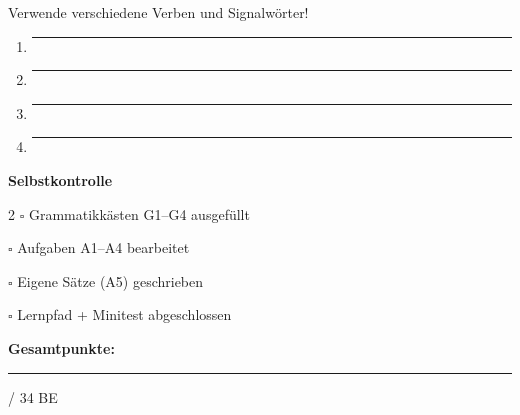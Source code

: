 \documentclass[11pt, a4paper]{article}
\newcommand{\gesamtpunkte}{34}
\newcommand{\luecke}[1]{\rule{#1}{0.4pt}}
\begin{document}
\vspace{4pt}
{\small Verwende verschiedene Verben und Signalwörter!}

\vspace{4pt}
\begin{enumerate}[label=\arabic*., itemsep=1.2em, leftmargin=1.5em]
\item \luecke{13cm}
\item \luecke{13cm}
\item \luecke{13cm}
\item \luecke{13cm}
\end{enumerate}

\vspace{10pt}


\begin{checklistbox}
{\small\textbf{Selbstkontrolle}}

\vspace{4pt}
{\footnotesize
\begin{multicols}{2}
$\square$ Grammatikkästen G1--G4 ausgefüllt

$\square$ Aufgaben A1--A4 bearbeitet

\columnbreak

$\square$ Eigene Sätze (A5) geschrieben

$\square$ Lernpfad + Minitest abgeschlossen
\end{multicols}}
\end{checklistbox}

\vspace{6pt}
\begin{flushright}
{\small\textbf{Gesamtpunkte:} \luecke{1cm} / \gesamtpunkte{} BE}
\end{flushright}
\end{document}
